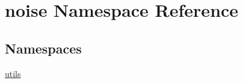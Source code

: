 \hypertarget{namespacenoise}{\section{noise Namespace Reference}
\label{namespacenoise}
}
\subsection*{Namespaces}
\begin{DoxyCompactItemize}
\item 
 \hyperlink{namespacenoise_1_1utils}{utils}
\end{DoxyCompactItemize}
